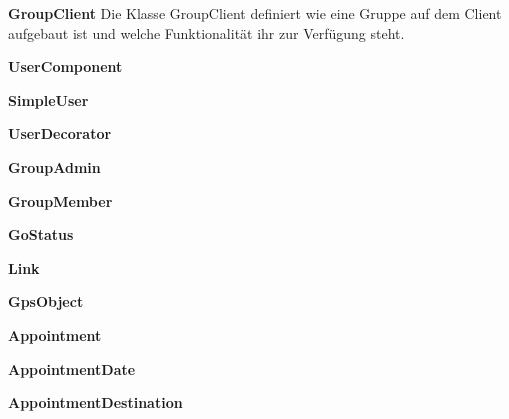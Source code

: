 \textbf{GroupClient}
Die Klasse GroupClient definiert wie eine Gruppe auf dem Client aufgebaut ist und welche Funktionalität ihr zur Verfügung steht.


\textbf{UserComponent}

\textbf{SimpleUser}

\textbf{UserDecorator}

\textbf{GroupAdmin}

\textbf{GroupMember}


\textbf{GoStatus}

\textbf{Link}

\textbf{GpsObject}


\textbf{Appointment}

\textbf{AppointmentDate}

\textbf{AppointmentDestination}








